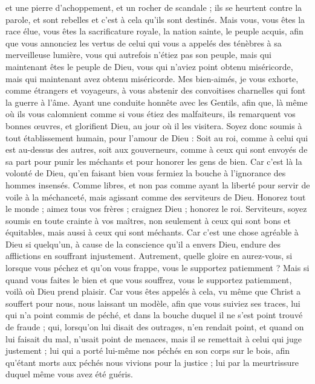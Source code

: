 \begin{multicols}{2}
et une pierre d'achoppement, et un rocher de scandale ; ils se heurtent contre la parole, et sont rebelles et c'est à cela qu'ils sont destinés.
Mais vous, vous êtes la race élue, vous êtes la sacrificature royale, la nation sainte, le peuple acquis, afin que vous annonciez les vertus de celui qui vous a appelés des ténèbres à sa merveilleuse lumière,
vous qui autrefois n'étiez pas son peuple, mais qui maintenant êtes le peuple de Dieu, vous qui n'aviez point obtenu miséricorde, mais qui maintenant avez obtenu miséricorde.
Mes bien-aimés, je vous exhorte, comme étrangers et voyageurs, à vous abstenir des convoitises charnelles qui font la guerre à l'âme.
Ayant une conduite honnête avec les Gentils, afin que, là même où ils vous calomnient comme si vous étiez des malfaiteurs, ils remarquent vos bonnes œuvres, et glorifient Dieu, au jour où il les visitera.
Soyez donc soumis à tout établissement humain, pour l'amour de Dieu : Soit au roi, comme à celui qui est au-dessus des autres,
soit aux gouverneurs, comme à ceux qui sont envoyés de sa part pour punir les méchants et pour honorer les gens de bien.
Car c'est là la volonté de Dieu, qu'en faisant bien vous fermiez la bouche à l'ignorance des hommes insensés.
Comme libres, et non pas comme ayant la liberté pour servir de voile à la méchanceté, mais agissant comme des serviteurs de Dieu.
Honorez tout le monde ; aimez tous vos frères ; craignez Dieu ; honorez le roi.
Serviteurs, soyez soumis en toute crainte à vos maîtres, non seulement à ceux qui sont bons et équitables, mais aussi à ceux qui sont méchants.
Car c'est une chose agréable à Dieu si quelqu'un, à cause de la conscience qu'il a envers Dieu, endure des afflictions en souffrant injustement. 
Autrement, quelle gloire en aurez-vous, si lorsque vous péchez et qu’on vous frappe, vous le supportez  patiemment ? Mais si quand vous faites le bien et que vous souffrez, vous le supportez patiemment, voilà où Dieu prend plaisir. 
Car vous êtes appelés à cela, vu même que Christ a souffert pour nous, nous laissant un modèle, afin que vous suiviez ses traces, 
lui qui n'a point commis de péché, et dans la bouche duquel il ne s'est point trouvé de fraude ;
qui, lorsqu'on lui disait des outrages, n'en rendait point, et quand on lui faisait du mal, n'usait point de menaces, mais il se remettait à celui qui juge justement ; 
lui qui a porté lui-même nos péchés en son corps sur le bois, afin qu'étant morts aux péchés nous vivions pour la justice ; lui par la meurtrissure duquel même vous avez été guéris.

\end{multicols}
